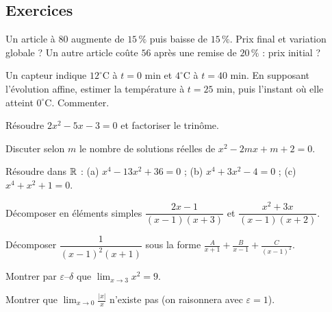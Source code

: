 \subsection{Exercices}
\begin{exo}[A]\label{c2e1}
Un article à $80$ \texteuro{} augmente de $15\,\%$ puis baisse de $15\,\%$. Prix final et variation globale ? Un autre article coûte $56$ \texteuro{} après une remise de $20\,\%$ : prix initial ?
\end{exo}
\begin{exo}[A]\label{c2e2}
Un capteur indique $12^\circ$C à $t=0$ min et $4^\circ$C à $t=40$ min. En supposant l'évolution affine, estimer la température à $t=25$ min, puis l'instant où elle atteint $0^\circ$C. Commenter.
\end{exo}
\begin{exo}[A]\label{c2e3}
Résoudre $2x^2-5x-3=0$ et factoriser le trinôme.
\end{exo}
\begin{exo}[B]\label{c2e4}
Discuter selon $m$ le nombre de solutions réelles de $x^2-2mx+m+2=0$.
\end{exo}
\begin{exo}[B]\label{c2e5}
Résoudre dans $\mathbb{R}$ : (a) $x^4-13x^2+36=0$ ; (b) $x^4+3x^2-4=0$ ; (c) $x^4+x^2+1=0$.
\end{exo}
\begin{exo}[B]\label{c2e6}
Décomposer en éléments simples $\dfrac{2x-1}{(x-1)(x+3)}$ et $\dfrac{x^2+3x}{(x-1)(x+2)}$.
\end{exo}
\begin{exo}[C]\label{c2e7}
Décomposer $\dfrac1{(x-1)^2(x+1)}$ sous la forme $\frac A{x+1}+\frac B{x-1}+\frac C{(x-1)^2}$.
\end{exo}
\begin{exo}[C]\label{c2e8}
Montrer par $\varepsilon$--$\delta$ que $\lim_{x\to3}x^2=9$.
\end{exo}
\begin{exo}[C]\label{c2e9}
Montrer que $\lim_{x\to0}\frac{|x|}x$ n'existe pas (on raisonnera avec $\varepsilon=1$).
\end{exo}

\ifcorr

